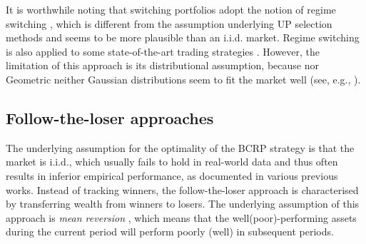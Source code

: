 %
%
%
%
%
%

It is worthwhile noting that switching portfolios adopt the notion of regime switching \citep{hamilton94, hamilton08}, which is different from the assumption underlying UP selection methods and seems to be more plausible than an i.i.d. market. Regime switching is also applied to some state-of-the-art trading strategies \citep{hardy01}. However, the limitation of this approach is its distributional assumption, because nor Geometric neither Gaussian distributions seem to fit the market well (see, e.g., \citep{cont01}).




\subsection{Follow-the-loser approaches}
\label{sec:follow-the-loser}

The underlying assumption for the optimality of the BCRP strategy is that the market is i.i.d., which usually fails to hold in real-world data and thus often results in inferior empirical performance, as documented in various previous works. Instead of tracking winners, the follow-the-loser approach is characterised by transferring wealth from winners to losers. The underlying assumption of this approach is \emph{mean reversion} \citep{bondt85, poterba88, lo90}, which means that the well(poor)-performing assets during the current period will perform poorly (well) in subsequent periods.


